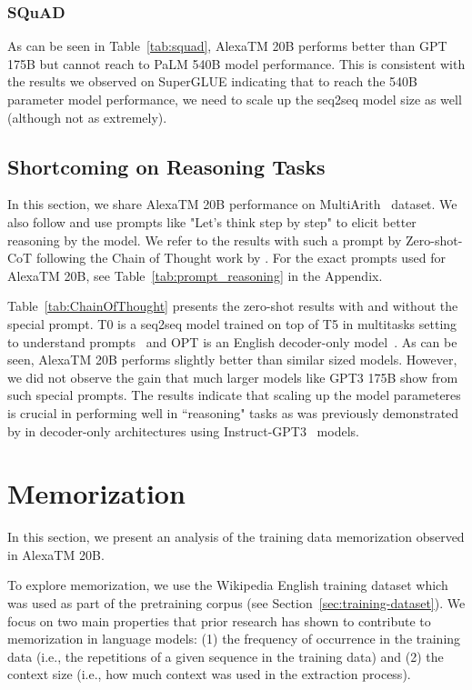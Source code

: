 \subsubsection{SQuAD}
\label{sec:SQUAD}
 As can be seen in Table~\ref{tab:squad}, {AlexaTM 20B} performs better than GPT 175B but cannot reach to PaLM 540B model performance. This is consistent with the results we observed on SuperGLUE indicating that to reach the 540B parameter model performance, we need to scale up the seq2seq model size as well (although not as extremely).

\subsection{Shortcoming on Reasoning Tasks}
\label{sec:shortcoming}

In this section, we share {AlexaTM 20B} performance on MultiArith~\citep{MultiArith} dataset. We also follow \cite{ZeroShotReasoning} and use prompts like "Let's think step by step" to elicit better reasoning by the model. We refer to the results with such a prompt by Zero-shot-CoT following the Chain of Thought work by \cite{ChainOfThought}. For the exact prompts used for {AlexaTM 20B}, see Table~\ref{tab:prompt_reasoning} in the Appendix.

Table~\ref{tab:ChainOfThought} presents the zero-shot results with and without the special prompt. T0 is a seq2seq model trained on top of T5 in multitasks setting to understand prompts~\citep{Sanh2021MultitaskPT} and OPT is an English decoder-only model~\citep{Zhang2022OPTOP}. As can be seen, {AlexaTM 20B} performs slightly better than similar sized models. However, we did not observe the gain that much larger models like GPT3 175B show from such special prompts. The results indicate that scaling up the model parameteres is crucial in performing well in ``reasoning" tasks as was previously demonstrated by \cite{ZeroShotReasoning} in decoder-only architectures using Instruct-GPT3~\citep{Ouyang2022TrainingLM} models.

\section{Memorization}
\label{sec:memorization_analysis}

In this section, we present an analysis of the training data memorization observed in {AlexaTM 20B}. 

To explore memorization, we use the Wikipedia English training dataset which was used as part of the pretraining corpus (see Section~\ref{sec:training-dataset}). We focus on two main properties that prior research has shown to contribute to memorization in language models: (1) the frequency of occurrence in the training data (i.e., the repetitions of a given sequence in the training data) and (2) the context size (i.e., how much context was used in the extraction process).

